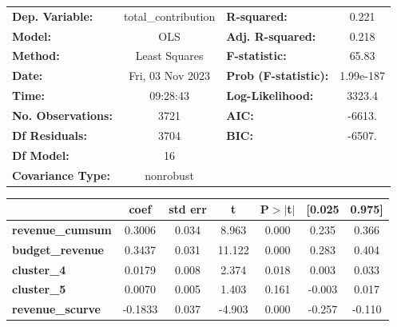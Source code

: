 \begin{center}
\begin{tabular}{lclc}
\toprule
\textbf{Dep. Variable:}           & total\_contribution & \textbf{  R-squared:         } &     0.221   \\
\textbf{Model:}                   &         OLS         & \textbf{  Adj. R-squared:    } &     0.218   \\
\textbf{Method:}                  &    Least Squares    & \textbf{  F-statistic:       } &     65.83   \\
\textbf{Date:}                    &   Fri, 03 Nov 2023  & \textbf{  Prob (F-statistic):} & 1.99e-187   \\
\textbf{Time:}                    &       09:28:43      & \textbf{  Log-Likelihood:    } &    3323.4   \\
\textbf{No. Observations:}        &          3721       & \textbf{  AIC:               } &    -6613.   \\
\textbf{Df Residuals:}            &          3704       & \textbf{  BIC:               } &    -6507.   \\
\textbf{Df Model:}                &            16       & \textbf{                     } &             \\
\textbf{Covariance Type:}         &      nonrobust      & \textbf{                     } &             \\
\bottomrule
\end{tabular}
\begin{tabular}{lcccccc}
                                  & \textbf{coef} & \textbf{std err} & \textbf{t} & \textbf{P$> |$t$|$} & \textbf{[0.025} & \textbf{0.975]}  \\
\midrule
\textbf{revenue\_cumsum}          &       0.3006  &        0.034     &     8.963  &         0.000        &        0.235    &        0.366     \\
\textbf{budget\_revenue}          &       0.3437  &        0.031     &    11.122  &         0.000        &        0.283    &        0.404     \\
\textbf{cluster\_4}               &       0.0179  &        0.008     &     2.374  &         0.018        &        0.003    &        0.033     \\
\textbf{cluster\_5}               &       0.0070  &        0.005     &     1.403  &         0.161        &       -0.003    &        0.017     \\
\textbf{revenue\_scurve}          &      -0.1833  &        0.037     &    -4.903  &         0.000        &       -0.257    &       -0.110     \\

\end{tabular}
\end{center}
